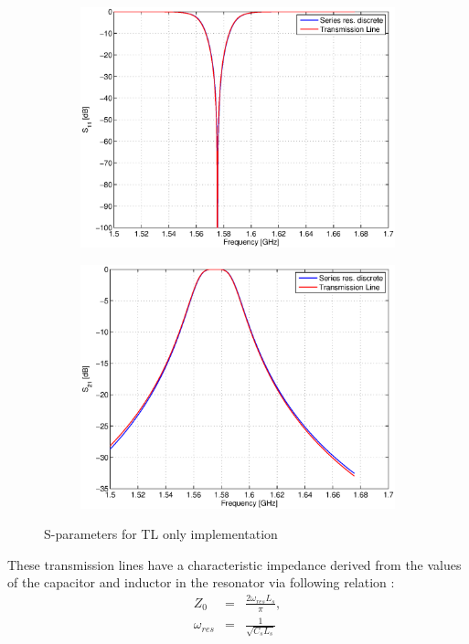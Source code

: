 \documentclass[a4paper]{article}        %
\begin{document}
  \begin{figure}[H]
  \centering
  	\begin{subfigure}{0.7\textwidth}
  	\includegraphics[width=\textwidth]{fig/Filter/2nd_order/plots/S11_TL.eps}
  	\end{subfigure}
  	\begin{subfigure}{0.7\textwidth}
  	\includegraphics[width=\textwidth]{fig/Filter/2nd_order/plots/S21_TL.eps}
  	\end{subfigure}
  	\caption{S-parameters for TL only implementation}
  	\label{fig:filter_spar_TL}
  \end{figure}

  These transmission lines have a characteristic impedance derived from the values of the capacitor and inductor in the resonator via following relation \cite{coupled_lines}: 
  \begin{eqnarray*}
    Z_0 &=& \frac{2 \omega_{res} L_s}{\pi},\\
    \omega_{res} &=& \frac{1}{\sqrt{C_s L_s}}
  \end{eqnarray*}
\end{document}

